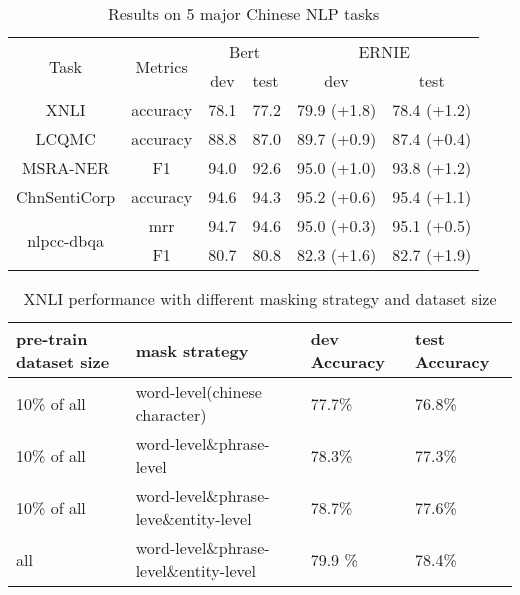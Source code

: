 \documentclass[11pt,a4paper]{article}
\begin{document}
\begin{table*}[htbp]
  \caption{Results on 5 major Chinese NLP tasks}
  \label{finetune_table}
  \centering

\begin{tabular}{c|c|cl|cc}
\hline
\multirow{2}{*}{Task}       & \multirow{2}{*}{Metrics} & \multicolumn{2}{c|}{Bert}       & \multicolumn{2}{c}{ERNIE}                                        \\ \cline{3-6} 
                            &                          & dev                      & test & dev                             & test                            \\ \hline
XNLI                        & accuracy                 & 78.1                     & 77.2 & 79.9 (+1.8)                     & 78.4 (+1.2)                     \\
LCQMC                       & accuracy                 & 88.8                     & 87.0 & 89.7 (+0.9)                     & 87.4 (+0.4)                     \\
MSRA-NER                    & F1                       & 94.0                     & 92.6 & 95.0 (+1.0)                     & 93.8 (+1.2)                     \\
ChnSentiCorp                & accuracy                 & 94.6                     & 94.3 & 95.2 (+0.6)                     & 95.4 (+1.1)                     \\
\multirow{2}{*}{nlpcc-dbqa} & mrr                      & 94.7                     & 94.6 & 95.0 (+0.3)                     & 95.1 (+0.5)                     \\
                            & F1                       & \multicolumn{1}{l}{80.7} & 80.8 & \multicolumn{1}{l}{82.3 (+1.6)} & \multicolumn{1}{l}{82.7 (+1.9)}
\end{tabular}
\end{table*}

\begin{table*}[!htbp]
  \caption{XNLI performance with different masking strategy and dataset size}
  \label{ablation_tabel}
  \centering
  \begin{tabular}{llll}
    \toprule
    \cmidrule(r){1-2}
    pre-train dataset size & mask strategy & dev Accuracy& test Accuracy \\
    \midrule
    10\% of all & word-level(chinese character) & 77.7\% & 76.8\% \\
    10\% of all & word-level\&phrase-level & 78.3\% & 77.3\% \\
    10\% of all & word-level\&phrase-leve\&entity-level & 78.7\%& 77.6\% \\
    all & word-level\&phrase-level\&entity-level & 79.9 \%& 78.4\% \\
    \bottomrule
  \end{tabular}
\end{table*}
\end{document}
